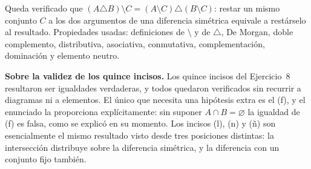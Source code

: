 \documentclass[11pt]{article}
\begin{document}
\begin{resp}
Queda verificado que $(A\triangle B)\setminus C=(A\setminus C)\triangle(B\setminus C)$: restar un
mismo conjunto $C$ a los dos argumentos de una diferencia simétrica equivale a restárselo al
resultado. Propiedades usadas: definiciones de $\setminus$ y de $\triangle$, De Morgan, doble
complemento, distributiva, asociativa, conmutativa, complementación, dominación y elemento
neutro.
\end{resp}

\begin{nota}
\textbf{Sobre la validez de los quince incisos.}
Los quince incisos del Ejercicio~8 resultaron ser igualdades verdaderas, y todos quedaron
verificados sin recurrir a diagramas ni a elementos. El único que necesita una hipótesis extra
es el (f), y el enunciado la proporciona explícitamente: sin suponer $A\cap B=\varnothing$ la
igualdad de (f) es falsa, como se explicó en su momento. Los incisos (l), (n) y (ñ) son
esencialmente el mismo resultado visto desde tres posiciones distintas: la intersección
distribuye sobre la diferencia simétrica, y la diferencia con un conjunto fijo también.
\end{nota}
\end{document}
